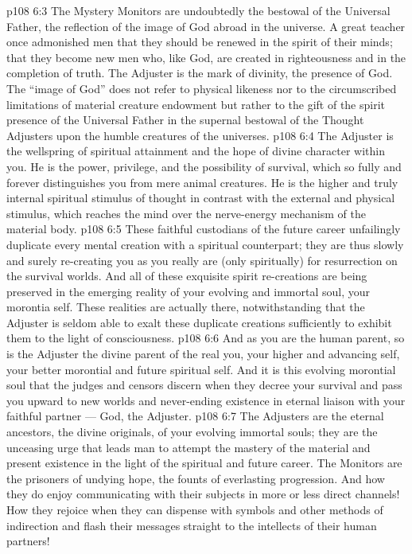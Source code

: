 \vs p108 6:3 \pc The Mystery Monitors are undoubtedly the bestowal of the Universal Father, the reflection of the image of God abroad in the universe. A great teacher once admonished men that they should be renewed in the spirit of their minds; that they become new men who, like God, are created in righteousness and in the completion of truth. The Adjuster is the mark of divinity, the presence of God. The “image of God” does not refer to physical likeness nor to the circumscribed limitations of material creature endowment but rather to the gift of the spirit presence of the Universal Father in the supernal bestowal of the Thought Adjusters upon the humble creatures of the universes.
\vs p108 6:4 The Adjuster is the wellspring of spiritual attainment and the hope of divine character within you. He is the power, privilege, and the possibility of survival, which so fully and forever distinguishes you from mere animal creatures. He is the higher and truly internal spiritual stimulus of thought in contrast with the external and physical stimulus, which reaches the mind over the nerve\hyp{}energy mechanism of the material body.
\vs p108 6:5 These faithful custodians of the future career unfailingly duplicate every mental creation with a spiritual counterpart; they are thus slowly and surely re\hyp{}creating you as you really are (only spiritually) for resurrection on the survival worlds. And all of these exquisite spirit re\hyp{}creations are being preserved in the emerging reality of your evolving and immortal soul, your morontia self. These realities are actually there, notwithstanding that the Adjuster is seldom able to exalt these duplicate creations sufficiently to exhibit them to the light of consciousness.
\vs p108 6:6 \pc And as you are the human parent, so is the Adjuster the divine parent of the real you, your higher and advancing self, your better morontial and future spiritual self. And it is this evolving morontial soul that the judges and censors discern when they decree your survival and pass you upward to new worlds and never\hyp{}ending existence in eternal liaison with your faithful partner --- God, the Adjuster.
\vs p108 6:7 The Adjusters are the eternal ancestors, the divine originals, of your evolving immortal souls; they are the unceasing urge that leads man to attempt the mastery of the material and present existence in the light of the spiritual and future career. The Monitors are the prisoners of undying hope, the founts of everlasting progression. And how they do enjoy communicating with their subjects in more or less direct channels! How they rejoice when they can dispense with symbols and other methods of indirection and flash their messages straight to the intellects of their human partners!
